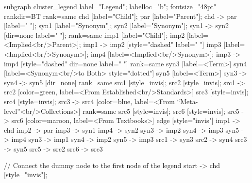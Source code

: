 \documentclass{article}
\begin{document}
{subgraph cluster_legend {
    label="Legend";
    labelloc="b";
    fontsize="48pt"
    rankdir=BT
    {
        rank=same
        chd [label="Child"];
        par [label="Parent"];
        chd -> par [label="                "];
        syn1 [label="Synonym"];
        syn2 [label="Synonym"];
        syn1 -> syn2 [dir=none label="                "];
    }
    {
        rank=same
        imp1 [label="Child"];
        imp2 [label=<Implied<br/>Parent>];
        imp1 -> imp2 [style="dashed" label="                "]
        imp3 [label=<Implied<br/>Synonym>];
        imp4 [label=<Implied<br/>Synonym>];
        imp3 -> imp4 [style="dashed" dir=none label="                "]
    }
    {
        rank=same
        syn3 [label=<Term>]
        syn4 [label=<Synonym<br/>to Both> style="dotted"]
        syn5 [label=<Term>]
        syn3 -> syn4 -> syn5 [dir=none]
    }
{
rank=same
src1 [style=invis];
src2 [style=invis];
src1 -> src2 [color=green, label=<From Established<br/>Standards>]
src3 [style=invis];
src4 [style=invis];
src3 -> src4 [color=blue, label=<From ``Meta-level''<br/>Collections>]
}
{
rank=same
src5 [style=invis];
src6 [style=invis];
src5 -> src6 [color=maroon, label=<From Textbooks>]
}
    edge [style="invis"]
    imp1 -> chd
    imp2 -> par
    imp3 -> syn1
    imp4 -> syn2
syn3 -> imp2
syn4 -> imp3
syn5 -> imp4
syn3 -> imp1
syn4 -> imp2
syn5 -> imp3
src1 -> syn3
src2 -> syn4
src3 -> syn5
src5 -> src2
src6 -> src3
}

// Connect the dummy node to the first node of the legend
start -> chd [style="invis"];
}
\end{document}
